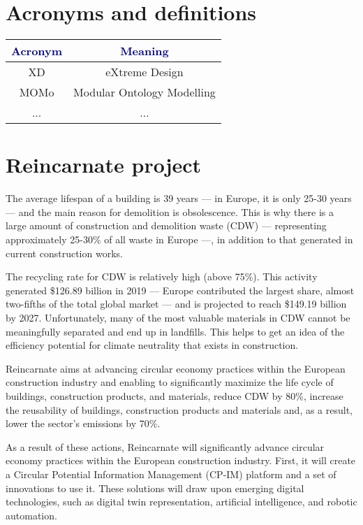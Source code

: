 \section*{Acronyms and definitions}
\begin{table}[h]
\centering
\renewcommand{\arraystretch}{1.3}
\begin{tabularx}{\textwidth}{|C|C|}
\hline
 \textcolor{darkblue}{\textbf{Acronym}} & \textcolor{darkblue}{\textbf{Meaning}}\\ \hline
XD &	eXtreme Design \\ \hline
MOMo	&Modular Ontology Modelling \\ \hline
... & ...\\ \hline
\end{tabularx}
\end{table}
\newpage
\section*{Reincarnate project}
The average lifespan of a building is 39 years — in Europe, it is only 25-30 years — and the main reason for demolition is obsolescence. This is why there is a large amount of construction and demolition waste (CDW) — representing approximately 25-30\% of all waste in Europe —, in addition to that generated in current construction works.

The recycling rate for CDW is relatively high (above 75\%). This activity generated \$126.89 billion in 2019 — Europe contributed the largest share, almost two-fifths of the total global market — and is projected to reach \$149.19 billion by 2027. Unfortunately, many of the most valuable materials in CDW cannot be meaningfully separated and end up in landfills.
This helps to get an idea of the efficiency potential for climate neutrality that exists in construction. 

Reincarnate aims at advancing circular economy practices within the European construction industry and enabling to significantly maximize the life cycle of buildings, construction products, and materials, reduce CDW by 80\%, increase the reusability of buildings, construction products and materials and, as a result, lower the sector's emissions by 70\%.

As a result of these actions, Reincarnate will significantly advance circular economy practices within the European construction industry.
First, it will create a Circular Potential Information Management (CP-IM) platform and a set of innovations to use it.  These solutions will draw upon emerging digital technologies, such as digital twin representation, artificial intelligence, and robotic automation.


